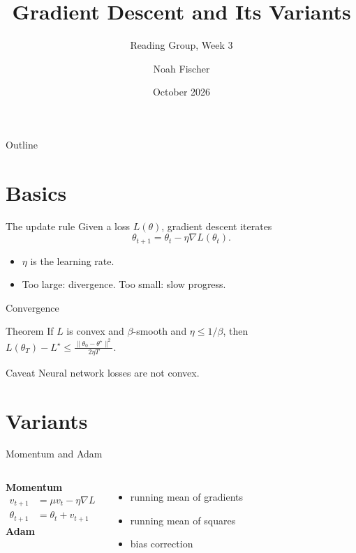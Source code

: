 \documentclass{beamer}
\title{Gradient Descent and Its Variants}
\subtitle{Reading Group, Week 3}
\author{Noah Fischer}
\institute{Machine Learning Lab}
\date{October 2026}
\begin{document}
\begin{frame}
  \titlepage
\end{frame}

\begin{frame}{Outline}
  \tableofcontents
\end{frame}

\section{Basics}
\begin{frame}{The update rule}
  Given a loss $L(\theta)$, gradient descent iterates
  \[
    \theta_{t+1} = \theta_t - \eta \nabla L(\theta_t).
  \]
  \begin{itemize}
    \item $\eta$ is the learning rate.
    \item Too large: divergence. Too small: slow progress.
  \end{itemize}
\end{frame}

\begin{frame}{Convergence}
  \begin{block}{Theorem}
    If $L$ is convex and $\beta$-smooth and $\eta \le 1/\beta$, then
    $L(\theta_T) - L^\star \le \frac{\|\theta_0-\theta^\star\|^2}{2\eta T}$.
  \end{block}
  \begin{alertblock}{Caveat}
    Neural network losses are not convex.
  \end{alertblock}
\end{frame}

\section{Variants}
\begin{frame}{Momentum and Adam}
  \begin{columns}
    \textbf{Momentum}
    \begin{align*}
      v_{t+1} &= \mu v_t - \eta \nabla L\\
      \theta_{t+1} &= \theta_t + v_{t+1}
    \end{align*}
    \textbf{Adam}
    \begin{itemize}
      \item running mean of gradients
      \item running mean of squares
      \item bias correction
    \end{itemize}
  \end{columns}
\end{frame}
\end{document}
